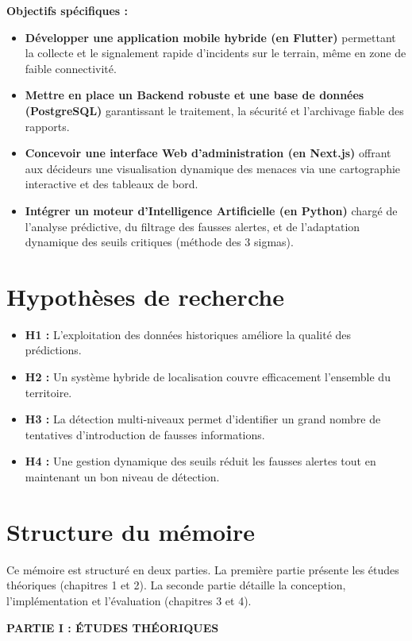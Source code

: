 \documentclass[12pt,a4paper]{article}
\begin{document}
\textbf{Objectifs spécifiques :}
\begin{itemize}
    \item \textbf{Développer une application mobile hybride (en Flutter)} permettant la collecte et le signalement rapide d'incidents sur le terrain, même en zone de faible connectivité.
    \item \textbf{Mettre en place un Backend robuste et une base de données (PostgreSQL)} garantissant le traitement, la sécurité et l'archivage fiable des rapports.
    \item \textbf{Concevoir une interface Web d'administration (en Next.js)} offrant aux décideurs une visualisation dynamique des menaces via une cartographie interactive et des tableaux de bord.
    \item \textbf{Intégrer un moteur d'Intelligence Artificielle (en Python)} chargé de l'analyse prédictive, du filtrage des fausses alertes, et de l'adaptation dynamique des seuils critiques (méthode des 3 sigmas).
\end{itemize}

\section*{Hypothèses de recherche}
\begin{itemize}
    \item \textbf{H1 :} L'exploitation des données historiques améliore la qualité des prédictions.
    \item \textbf{H2 :} Un système hybride de localisation couvre efficacement l'ensemble du territoire.
    \item \textbf{H3 :} La détection multi‑niveaux permet d'identifier un grand nombre de tentatives d'introduction de fausses informations.
    \item \textbf{H4 :} Une gestion dynamique des seuils réduit les fausses alertes tout en maintenant un bon niveau de détection.
\end{itemize}

\section*{Structure du mémoire}
Ce mémoire est structuré en deux parties. La première partie présente les études théoriques (chapitres 1 et 2). La seconde partie détaille la conception, l'implémentation et l'évaluation (chapitres 3 et 4).

\newpage
\vspace*{\fill}
\begin{center}
    \Huge \textbf{PARTIE I : ÉTUDES THÉORIQUES}
\end{center}
\vspace*{\fill}
\newpage
\end{document}
